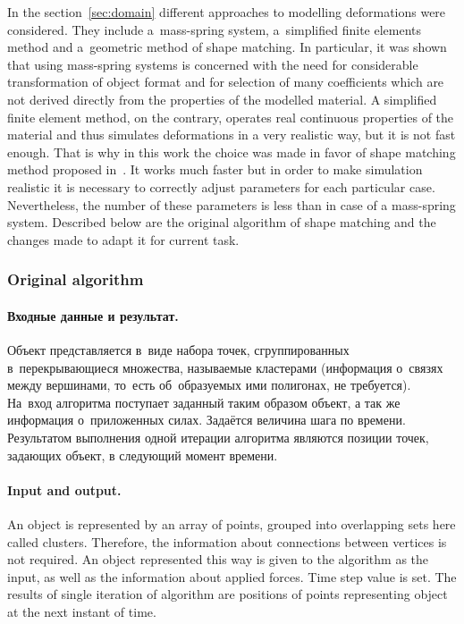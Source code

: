 \documentclass[a4paper, 12pt, titlepage]{extarticle}
\begin{document}
      In the section~\ref{sec:domain} different approaches to modelling deformations were
      considered. They include a~mass-spring system, a~simplified finite elements method and
      a~geometric method of shape matching. In particular, it was shown that using mass-spring
      systems is concerned with the need for considerable transformation of object format and for
      selection of many coefficients which are not derived directly from the properties of the
      modelled material. A simplified finite element method, on the contrary, operates real
      continuous properties of the material and thus simulates deformations in a very realistic way,
      but it is not fast enough. That is why in this work the choice was made in favor of shape
      matching method proposed in~\cite{mueller-meshless}. It works much faster but in order to make
      simulation realistic it is necessary to correctly adjust parameters for each particular case.
      Nevertheless, the number of these parameters is less than in case of a mass-spring system.
      Described below are the original algorithm of shape matching and the changes made to adapt it
      for current task.

      \subsubsection{Original algorithm}\label{sssec:original_algorithm}

\begin{original}
        \paragraph{Входные данные и результат.} Объект представляется в~виде набора точек,
        сгруппированных в~перекрывающиеся множества, называемые кластерами
        (информация о~связях между вершинами, то~есть об~образуемых ими полигонах, не требуется).
        На~вход алгоритма поступает заданный таким образом объект, а так же информация о~приложенных
        силах. Задаётся величина шага по времени. Результатом выполнения одной итерации алгоритма
        являются позиции точек, задающих объект, в следующий момент времени.
\end{original}

        \paragraph{Input and output.} An object is represented by an array of points, grouped into
        overlapping sets here called clusters. Therefore, the information about connections between
        vertices is not required. An object represented this way is given to the algorithm as the
        input, as well as the information about applied forces. Time step value is set. The results
        of single iteration of algorithm are positions of points representing object at the next
        instant of time.
\end{document}
